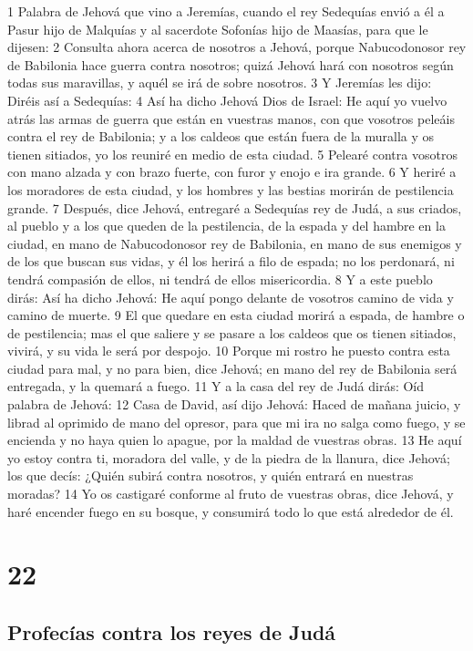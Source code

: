 1 Palabra de Jehová que vino a Jeremías, cuando el rey Sedequías envió a él a Pasur hijo de Malquías y al sacerdote Sofonías hijo de Maasías, para que le dijesen:
2 Consulta ahora acerca de nosotros a Jehová, porque Nabucodonosor rey de Babilonia hace guerra contra nosotros; quizá Jehová hará con nosotros según todas sus maravillas, y aquél se irá de sobre nosotros.
3 Y Jeremías les dijo: Diréis así a Sedequías:
4 Así ha dicho Jehová Dios de Israel: He aquí yo vuelvo atrás las armas de guerra que están en vuestras manos, con que vosotros peleáis contra el rey de Babilonia; y a los caldeos que están fuera de la muralla y os tienen sitiados, yo los reuniré en medio de esta ciudad.
5 Pelearé contra vosotros con mano alzada y con brazo fuerte, con furor y enojo e ira grande.
6 Y heriré a los moradores de esta ciudad, y los hombres y las bestias morirán de pestilencia grande.
7 Después, dice Jehová, entregaré a Sedequías rey de Judá, a sus criados, al pueblo y a los que queden de la pestilencia, de la espada y del hambre en la ciudad, en mano de Nabucodonosor rey de Babilonia, en mano de sus enemigos y de los que buscan sus vidas, y él los herirá a filo de espada; no los perdonará, ni tendrá compasión de ellos, ni tendrá de ellos misericordia.
8 Y a este pueblo dirás: Así ha dicho Jehová: He aquí pongo delante de vosotros camino de vida y camino de muerte.
9 El que quedare en esta ciudad morirá a espada, de hambre o de pestilencia; mas el que saliere y se pasare a los caldeos que os tienen sitiados, vivirá, y su vida le será por despojo.
10 Porque mi rostro he puesto contra esta ciudad para mal, y no para bien, dice Jehová; en mano del rey de Babilonia será entregada, y la quemará a fuego.
11 Y a la casa del rey de Judá dirás: Oíd palabra de Jehová:
12 Casa de David, así dijo Jehová: Haced de mañana juicio, y librad al oprimido de mano del opresor, para que mi ira no salga como fuego, y se encienda y no haya quien lo apague, por la maldad de vuestras obras.
13 He aquí yo estoy contra ti, moradora del valle, y de la piedra de la llanura, dice Jehová; los que decís: ¿Quién subirá contra nosotros, y quién entrará en nuestras moradas?
14 Yo os castigaré conforme al fruto de vuestras obras, dice Jehová, y haré encender fuego en su bosque, y consumirá todo lo que está alrededor de él.

\chapter{22}

\section*{Profecías contra los reyes de Judá}

